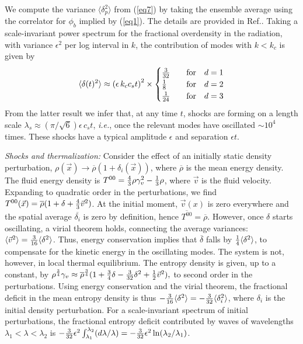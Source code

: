\documentclass[prl,aps,10pt,twocolumn,showkeys,nofootinbib]{revtex4-1}
\def\bena{\begin{eqnarray}}
\def\eena{\end{eqnarray}}
\begin{document}
We compute the variance $\langle \delta_{p}^2 \rangle$ from (\ref{eq7}) by taking the ensemble average using the correlator for $\phi_b$ implied by (\ref{eq1}). The details are provided in Ref.\cite{penturoklong}. Taking a scale-invariant power spectrum for the fractional overdensity in the radiation, with variance $\epsilon^2$ per log interval in $k$, the contribution of modes with $k<k_c$ is given by 
\bena
 \langle \delta(t)^2\rangle \approx\left(\epsilon \,k_c c_s t\right)^2\times
  \begin{cases}
   {3\over 32}  & \quad  {\rm for} \quad d=1    \cr
  {1\over 8}     &\quad {\rm for} \quad d=2    \cr
  {1\over 24}     & \quad  {\rm for} \quad d=3   \cr
  \end{cases}
\label{eq8}
\eena
From the latter result we infer that, at any time $t$, shocks are forming on a length scale $\lambda_s\approx (\pi/\sqrt{6}) \epsilon \, c_s t$, {\it i.e.}, once the relevant modes have oscillated $\sim 10^4$ times. These shocks have a typical amplitude $\epsilon$ and separation $\epsilon t$. 

{\it Shocks and thermalization:} Consider the effect of an initially static density perturbation, $\rho(\vec{x})\rightarrow \overline{\rho}\left(1+\delta_i(\vec{x})\right)$, where $\overline{\rho}$ is the mean energy density. The fluid energy density is $T^{00}= {4\over 3} \rho \gamma_{v}^2-{1\over 3} \rho$, where $\vec{v}$ is the fluid velocity.  Expanding to quadratic order in the perturbations, we find $T^{00}(\vec{x})=\overline{\rho}(1+\delta+{4\over 3} \vec{v}^2)$. At the initial moment, $\vec{v}(x)$ is zero everywhere and the spatial average  $\overline{\delta_i}$ is zero by definition, hence $\overline{T^{00}} =\overline{\rho}$. However, once $\delta$ starts oscillating, a virial theorem holds, connecting the average variances: $\langle \vec{v}^2\rangle ={3\over 16}\langle  \delta^2\rangle$. Thus, energy conservation implies that $\overline{\delta}$ falls by ${1\over 4} \langle \delta^2 \rangle$, to compensate for the kinetic energy in the oscillating modes. The system is not, however, in local thermal equilibrium. The entropy density is given, up to a constant, by $\rho^{3\over 4} \gamma_{v}\approx \overline{\rho}^{3\over 4} (1+{3\over 4} \delta -{3\over 32} \delta^2 +{1\over 2} \vec{v}^2),$ to second order in the perturbations. Using energy conservation and the virial theorem, the fractional deficit in the mean entropy density is thus $-{3\over 16} \langle \delta^2 \rangle=-{3\over 32} \langle \delta_i^2 \rangle$, where $\delta_i$ is the initial density perturbation. For a scale-invariant spectrum of initial perturbations, the fractional entropy deficit contributed by waves of wavelengths $\lambda_{1}<\lambda<\lambda_{2}$ is  $-{3\over 32} \epsilon^2 \int_{\lambda_{1}}^{\lambda_{2}}(d\lambda/\lambda)=-{3\over 32} \epsilon^2\ln(\lambda_{2}/\lambda_{1})$. 
 
\end{document}
